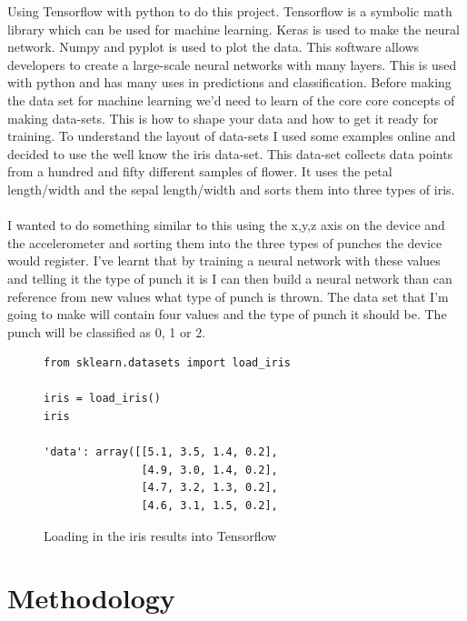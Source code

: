 \documentclass[a4paper,12pt]{report}
\begin{document}
Using Tensorflow with python to do this project. Tensorflow is a symbolic math library which can be used for machine learning. Keras is used to make the neural network. Numpy and pyplot is used to plot the data. This software allows developers to create a large-scale neural networks with many layers. This is used with python and has many uses in predictions and classification. Before making the data set for machine learning we'd need to learn of the core core concepts of making data-sets. This is how to shape your data and how to get it ready for training. To understand the layout of data-sets I used some examples online and decided to use the well know the iris data-set. This data-set collects data points from a hundred and fifty different samples of flower. It uses the petal length/width and the sepal length/width and sorts them into three types of iris.
\\
\\
I wanted to do something similar to this using the x,y,z axis on the device and the accelerometer and sorting them into the three types of punches the device would register. I've learnt that by training a neural network with these values and telling it the type of punch it is I can then build a neural network than can reference from new values what type of punch is thrown. The data set that I'm going to make will contain four values and the type of punch it should be. The punch will be classified as 0, 1 or 2.

\begin{figure}[h]
\begin{verbatim}
from sklearn.datasets import load_iris

iris = load_iris()
iris

'data': array([[5.1, 3.5, 1.4, 0.2],
               [4.9, 3.0, 1.4, 0.2],
               [4.7, 3.2, 1.3, 0.2],
               [4.6, 3.1, 1.5, 0.2],
\end{verbatim}
\caption{Loading in the iris results into Tensorflow}
\label{fig:iris}
\end{figure}

\chapter{Methodology}
\end{document}
